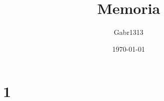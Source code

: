 \documentclass[12pt, a4paper]{report}
\title{Memoria}
\author{Gabr1313}
\date{\today}
\begin{document}
\justify
\sloppy
\maketitle
\tableofcontents

\chapter{1}
\end{document}
